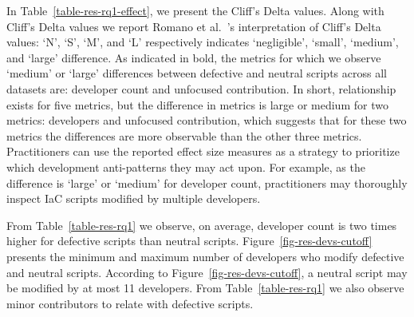 \documentclass[smallextended]{svjour3}       %
\begin{document}



In Table~\ref{table-res-rq1-effect}, we present the Cliff's Delta values. Along with Cliff's Delta values we report Romano et al.~\citep{Romano:CliffsCutoff2006}'s interpretation of Cliff's Delta values: `N', `S', `M', and `L' respectively indicates `negligible', `small', `medium', and `large' difference. As indicated in bold, the metrics for which we observe `medium' or `large' differences between defective and neutral scripts across all datasets are: developer count and unfocused contribution. In short, relationship exists for five metrics, but the difference in metrics is large or medium for two metrics: developers and unfocused contribution, which suggests that for these two metrics the differences are more observable than the other three metrics. Practitioners can use the reported effect size measures as a strategy to prioritize which development anti-patterns they may act upon. For example, as the difference is `large' or `medium' for developer count, practitioners may thoroughly inspect IaC scripts modified by multiple developers.         


From Table~\ref{table-res-rq1} we observe, on average, developer count is two times higher for defective scripts than neutral scripts. Figure~\ref{fig-res-devs-cutoff} presents the minimum and maximum number of developers who modify defective and neutral scripts. According to Figure~\ref{fig-res-devs-cutoff}, a neutral script may be modified by at most 11 developers. From Table~\ref{table-res-rq1} we also observe minor contributors to relate with defective scripts.
\end{document}
